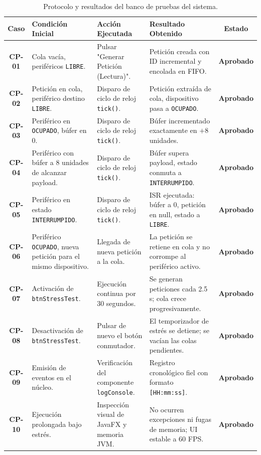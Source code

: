 \documentclass[11pt,letterpaper]{article}
\begin{document}
\begin{table}[htbp]
\centering
\small
\renewcommand{\arraystretch}{1.25}
\begin{tabularx}{\textwidth}{|c|p{4.2cm}|L|L|c|}
\hline
\textbf{Caso} & \textbf{Condición Inicial} & \textbf{Acción Ejecutada} & \textbf{Resultado Obtenido} & \textbf{Estado} \\ \hline
\textbf{CP-01} & Cola vacía, periféricos \texttt{LIBRE}. & Pulsar "Generar Petición (Lectura)". & Petición creada con ID incremental y encolada en FIFO. & \textbf{Aprobado} \\ \hline
\textbf{CP-02} & Petición en cola, periférico destino \texttt{LIBRE}. & Disparo de ciclo de reloj \texttt{tick()}. & Petición extraída de cola, dispositivo pasa a \texttt{OCUPADO}. & \textbf{Aprobado} \\ \hline
\textbf{CP-03} & Periférico en \texttt{OCUPADO}, búfer en 0. & Disparo de ciclo de reloj \texttt{tick()}. & Búfer incrementado exactamente en $+8$ unidades. & \textbf{Aprobado} \\ \hline
\textbf{CP-04} & Periférico con búfer a 8 unidades de alcanzar payload. & Disparo de ciclo de reloj \texttt{tick()}. & Búfer supera payload, estado conmuta a \texttt{INTERRUMPIDO}. & \textbf{Aprobado} \\ \hline
\textbf{CP-05} & Periférico en estado \texttt{INTERRUMPIDO}. & Disparo de ciclo de reloj \texttt{tick()}. & ISR ejecutada: búfer a 0, petición en null, estado a \texttt{LIBRE}. & \textbf{Aprobado} \\ \hline
\textbf{CP-06} & Periférico \texttt{OCUPADO}, nueva petición para el mismo dispositivo. & Llegada de nueva petición a la cola. & La petición se retiene en cola y no corrompe al periférico activo. & \textbf{Aprobado} \\ \hline
\textbf{CP-07} & Activación de \texttt{btnStressTest}. & Ejecución continua por 30 segundos. & Se generan peticiones cada 2.5 s; cola crece progresivamente. & \textbf{Aprobado} \\ \hline
\textbf{CP-08} & Desactivación de \texttt{btnStressTest}. & Pulsar de nuevo el botón conmutador. & El temporizador de estrés se detiene; se vacían las colas pendientes. & \textbf{Aprobado} \\ \hline
\textbf{CP-09} & Emisión de eventos en el núcleo. & Verificación del componente \texttt{logConsole}. & Registro cronológico fiel con formato \texttt{[HH:mm:ss]}. & \textbf{Aprobado} \\ \hline
\textbf{CP-10} & Ejecución prolongada bajo estrés. & Inspección visual de JavaFX y memoria JVM. & No ocurren excepciones ni fugas de memoria; UI estable a 60 FPS. & \textbf{Aprobado} \\ \hline
\end{tabularx}
\caption{Protocolo y resultados del banco de pruebas del sistema.}
\label{tab:pruebas}
\end{table}
\end{document}
